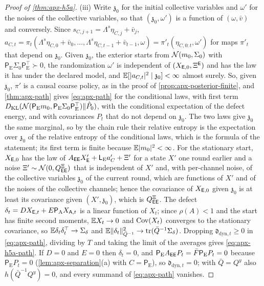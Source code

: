 \begin{proof}[Proof of \cref{thm:apx-h5a}]
(iii) Write $\mathfrak z_0$ for the initial collective variables and $\omega'$ for the noises of the collective variables, so that $(\mathfrak z_0,\omega')$ is a function of $(\omega,\bar v)$ and conversely. Since $s_{C,j+1}=\Lambda^s\eta_{C,j}+\bar v_j$, $a_{C,t}=\pi_t(\Lambda^s\eta_{C,0}+\bar v_0,\dots,\Lambda^s\eta_{C,t-1}+\bar v_{t-1},\omega)=\pi'_t(\eta_{C,0:t},\omega')$ for maps $\pi'_t$ that depend on $\mathfrak z_0$. Given $\mathfrak z_0$, the exterior starts from $\mathcal{N}(m_0,\Sigma_0)$ with $\mathsf P_{\mathrm E}\Sigma_0\mathsf P_{\mathrm E}^\top\succ0$, the randomization $\omega'$ is independent of $(X_{\mathsf{E},0},\Xi^{\mathsf{E}})$ and has the law it has under the declared model, and $\mathbb{E}[\lvert a_{C,t}\rvert^2\mid\mathfrak z_0]<\infty$ almost surely. So, given $\mathfrak z_0$, $\pi'$ is a causal coarse policy, as in the proof of \cref{prop:apx-posterior-finite}, and \cref{thm:apx-path} gives \eqref{eq:apx-path} for the conditional laws, with first term $D_{\mathrm{KL}}(\mathcal{N}(\mathsf P_{\mathrm E}m_0,\mathsf P_{\mathrm E}\Sigma_0\mathsf P_{\mathrm E}^\top)\Vert\hat P_0)$, with the conditional expectation of the defect energy, and with covariances $P_t$ that do not depend on $\mathfrak z_0$. The two laws give $\mathfrak z_0$ the same marginal, so by the chain rule their relative entropy is the expectation over $\mathfrak z_0$ of the relative entropy of the conditional laws, which is the formula of the statement; its first term is finite because $\mathbb{E}\lvert m_0\rvert^2<\infty$. For the stationary start, $X_{\mathsf{E},0}$ has the law of $A_{\mathsf{E}\mathsf{E}}X'_{\mathsf{E}}+\mathsf L_{\mathrm E}a'_C+\Xi'$ for a state $X'$ one round earlier and a noise $\Xi'\sim\mathcal{N}(0,Q^{\Xi}_{\mathsf{E}\mathsf{E}})$ that is independent of $X'$ and, with per-channel noise, of the collective variables $\mathfrak z_0$ of the current round, which are functions of $X'$ and of the noises of the collective channels; hence the covariance of $X_{\mathsf{E},0}$ given $\mathfrak z_0$ is at least its covariance given $(X',\mathfrak z_0)$, which is $Q^{\Xi}_{\mathsf{E}\mathsf{E}}$. The defect $\delta_t=DX_{\mathsf{E},t}+E\mathsf P_{\mathrm A}X_{\mathsf{A},t}$ is a linear function of $X_t$; since $\rho(A)<1$ and the start has finite second moments, $\mathbb{E} X_t\to0$ and $\operatorname{Cov}(X_t)$ converges to the stationary covariance, so $\mathbb{E}\delta_t\delta_t^\top\to\Sigma_\delta$ and $\mathbb{E}\Vert\delta_t\Vert^2_{\bar Q^{-1}}\to\operatorname{tr}(\bar Q^{-1}\Sigma_\delta)$. Dropping $\mathfrak d_{\mathrm{dyn},t}\ge0$ in \eqref{eq:apx-path}, dividing by $T$ and taking the limit of the averages gives \eqref{eq:apx-h5a-path}. If $D=0$ and $E=0$ then $\delta_t=0$, and $\mathsf P_{\mathrm E}A_{\mathsf{E}\mathsf{E}}P_t=\bar F\mathsf P_{\mathrm E}P_t=0$ because $\mathsf P_{\mathrm E}P_t=0$ (\cref{lem:apx-separation}(a) with $C=\mathsf P_{\mathrm E}$), so $\mathfrak d_{\mathrm{dyn},t}=0$; with $\bar Q=Q^y$ also $h(\bar Q^{-1}Q^y)=0$, and every summand of \eqref{eq:apx-path} vanishes.


\end{proof}
